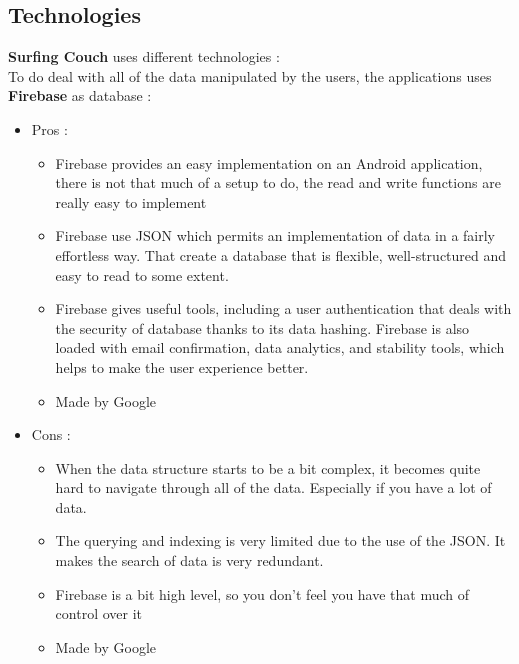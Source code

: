 \documentclass[paper=a4, fontsize=12pt,DIV=14]{scrartcl}    %
\begin{document}
        	\newpage
        	\subsection{Technologies}
        		
\textbf{Surfing Couch} uses different technologies :\\
To do deal with all of the data manipulated by the users, the applications uses \textbf{Firebase} as database : \\
\begin{itemize}
\item Pros :
	\begin{itemize}
	\item 	Firebase provides an easy implementation on an Android application, there is not that much of a setup to do, the read and write functions are really easy to implement
	\item 	Firebase use JSON which permits an implementation of data in a fairly effortless way. That create a database that is flexible, well-structured and easy to read to some extent.
	\item 	Firebase gives useful tools, including a user authentication that deals with the security of database thanks to its data hashing. Firebase is also loaded with email confirmation, data analytics, and stability tools, which helps to make the user experience better.
	\item 	Made by Google
	\end{itemize}

\item Cons :
	\begin{itemize}
	\item	When the data structure starts to be a bit complex, it becomes quite hard to navigate through all of the data. Especially if you have a lot of data.
	\item	The querying and indexing is very limited due to the use of the JSON. It makes the search of data is very redundant.
	\item	Firebase is a bit high level, so you don’t feel you have that much of control over it
	\item	Made by Google
	\end{itemize}
\end{itemize}
\end{document}
